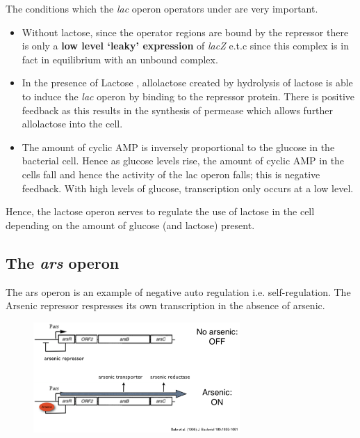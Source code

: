 \documentclass[a4paper]{article}
\newcommand{\introduce}[1]{%
  \leavevmode %
  \marginpar{\small\emph{#1}}%
}
\begin{document}
The conditions which the \emph{lac} operon operators under are very important.
\begin{itemize}
\item Without lactose, since the operator regions are bound by the repressor there is only a \textbf{low level `leaky' expression}\introduce{Leak} of \emph{lacZ} e.t.c since this complex is in fact in equilibrium with an unbound complex.

\item In the presence of Lactose\introduce{Lactose}, allolactose created by hydrolysis of lactose is able to induce the \emph{lac} operon by binding to the repressor protein. There is positive feedback as this results in the synthesis of permease which allows further allolactose into the cell.

\item The amount of cyclic AMP is inversely proportional to the glucose in the bacterial cell.\introduce{Glucose} Hence as glucose levels rise, the amount of cyclic AMP in the cells fall and hence the activity of the lac operon falls; this is negative feedback. With high levels of glucose, transcription only occurs at a low level.
\end{itemize}

Hence, the lactose operon serves to regulate the use of lactose in the cell depending on the amount of glucose (and lactose) present.

\subsection{The \emph{ars} operon}
The ars operon is an example of negative auto regulation i.e. self-regulation. The Arsenic repressor respresses its own transcription in the absence of arsenic.

\begin{figure}[h!]
\begin{center}
\includegraphics[width=0.7\textwidth]{arsOperon}
\end{center}
\end{figure}
\end{document}
